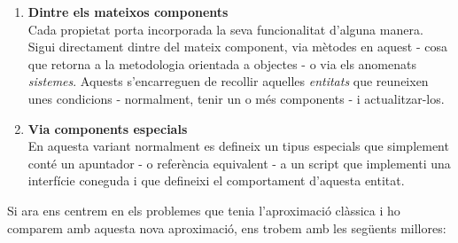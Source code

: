\begin{enumerate}
  \item {\bf Dintre els mateixos components} \hfill \\
    Cada propietat porta incorporada la seva funcionalitat d'alguna manera. Sigui directament dintre del mateix component, via mètodes en aquest - cosa que retorna a la metodologia orientada a objectes - o via els anomenats {\em sistemes}. Aquests s'encarreguen de recollir aquelles {\em entitats} que reuneixen unes condicions - normalment, tenir un o més components - i actualitzar-los.
    
  \item {\bf Via components especials} \hfill \\
    En aquesta variant normalment es defineix un tipus especials que simplement conté un apuntador - o referència equivalent - a un script que implementi una interfície coneguda i que defineixi el comportament d'aquesta entitat.
    
\end{enumerate}

Si ara ens centrem en els problemes que tenia l'aproximació clàssica i ho comparem amb aquesta nova aproximació, ens trobem amb les següents millores:

